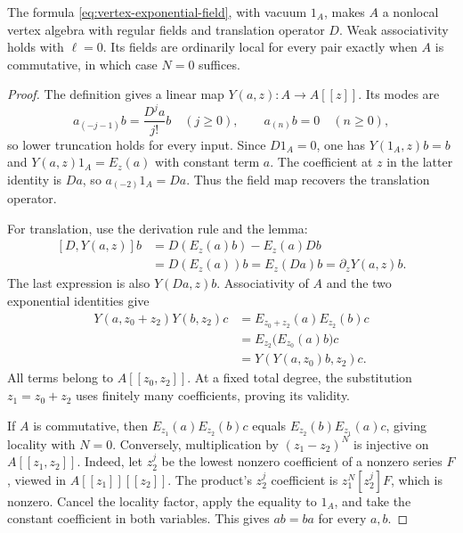 \begin{theorem}\label{thm:vertex-differential-algebra}
The formula \eqref{eq:vertex-exponential-field}, with vacuum $1_A$,
makes $A$ a nonlocal vertex algebra with regular fields and
translation operator $D$.
Weak associativity holds with $\ell=0$.
Its fields are ordinarily local for every pair exactly when $A$
is commutative, in which case $N=0$ suffices.
\end{theorem}

\begin{proof}
The definition gives a linear map $Y(a,z):A\to A[[z]]$.
Its modes are
\[
 a_{(-j-1)}b=\frac{D^ja}{j!}b\quad(j\geq0),
 \qquad a_{(n)}b=0\quad(n\geq0),
\]
so lower truncation holds for every input.
Since $D1_A=0$, one has
$Y(1_A,z)b=b$ and $Y(a,z)1_A=E_z(a)$ with constant term $a$.
The coefficient at $z$ in the latter identity is $Da$, so
$a_{(-2)}1_A=Da$.
Thus the field map recovers the translation operator.

For translation, use the derivation rule and the lemma:
\[
 \begin{aligned}
 [D,Y(a,z)]b
   &=D(E_z(a)b)-E_z(a)Db\\
   &=D(E_z(a))b
     =E_z(Da)b=\partial_zY(a,z)b.
 \end{aligned}
\]
The last expression is also $Y(Da,z)b$.
Associativity of $A$ and the two exponential identities give
\begin{equation}\label{eq:vertex-exact-associativity}
 \begin{aligned}
 Y(a,z_0+z_2)Y(b,z_2)c
   &=E_{z_0+z_2}(a)E_{z_2}(b)c\\
   &=E_{z_2}\bigl(E_{z_0}(a)b\bigr)c\\
   &=Y(Y(a,z_0)b,z_2)c.
 \end{aligned}
\end{equation}
All terms belong to $A[[z_0,z_2]]$.
At a fixed total degree, the substitution $z_1=z_0+z_2$
uses finitely many coefficients, proving its validity.

If $A$ is commutative, then $E_{z_1}(a)E_{z_2}(b)c$ equals
$E_{z_2}(b)E_{z_1}(a)c$, giving locality with $N=0$.
Conversely, multiplication by $(z_1-z_2)^N$ is injective on
$A[[z_1,z_2]]$.
Indeed, let $z_2^j$ be the lowest nonzero coefficient of a
nonzero series $F$, viewed in $A[[z_1]][[z_2]]$.
The product's $z_2^j$ coefficient is $z_1^N[z_2^j]F$, which is nonzero.
Cancel the locality factor, apply the equality to $1_A$, and take
the constant coefficient in both variables.
This gives $ab=ba$ for every $a,b$.
\end{proof}

